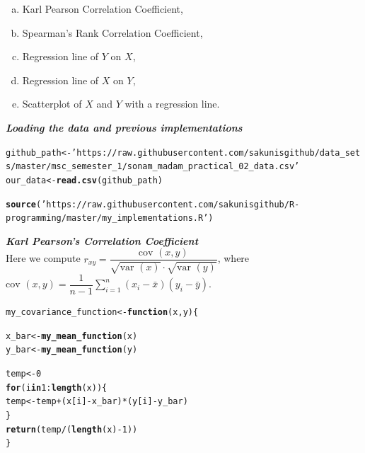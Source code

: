 \documentclass[11pt, a4paper]{article}\usepackage[]{graphicx}\usepackage[]{xcolor}
\makeatletter
\newcommand{\hlnum}[1]{\textcolor[rgb]{0.686,0.059,0.569}{#1}}%
\newcommand{\hlsng}[1]{\textcolor[rgb]{0.192,0.494,0.8}{#1}}%
\newcommand{\hlopt}[1]{\textcolor[rgb]{0,0,0}{#1}}%
\newcommand{\hldef}[1]{\textcolor[rgb]{0.345,0.345,0.345}{#1}}%
\newcommand{\hlkwa}[1]{\textcolor[rgb]{0.161,0.373,0.58}{\textbf{#1}}}%
\newcommand{\hlkwb}[1]{\textcolor[rgb]{0.69,0.353,0.396}{#1}}%
\newcommand{\hlkwc}[1]{\textcolor[rgb]{0.333,0.667,0.333}{#1}}%
\newcommand{\hlkwd}[1]{\textcolor[rgb]{0.737,0.353,0.396}{\textbf{#1}}}%
\newenvironment{kframe}{%
 \def\at@end@of@kframe{}%
 \ifinner\ifhmode%
  \def\at@end@of@kframe{\end{minipage}}%
  \begin{minipage}{\columnwidth}%
 \fi\fi%
 \def\FrameCommand##1{\hskip\@totalleftmargin \hskip-\fboxsep
 \colorbox{shadecolor}{##1}\hskip-\fboxsep
     \hskip-\linewidth \hskip-\@totalleftmargin \hskip\columnwidth}%
 \MakeFramed {\advance\hsize-\width
   \@totalleftmargin\z@ \linewidth\hsize
   \@setminipage}}%
 {\par\unskip\endMakeFramed%
 \at@end@of@kframe}
\newenvironment{knitrout}{}{} %
\makeatother
\begin{document}
\begin{enumerate}[(a)]
  \item Karl Pearson Correlation Coefficient,
  \item Spearman's Rank Correlation Coefficient,
  \item Regression line of $Y$ on $X$,
  \item Regression line of $X$ on $Y$,
  \item Scatterplot of $X$ and $Y$ with a regression line.
\end{enumerate}

\faArrowAltCircleRight[regular] \textit{\textbf{Loading the data and previous implementations}}

\begin{knitrout}\tiny
{}\color{fgcolor}\begin{kframe}
\begin{alltt}
\hldef{github_path} \hlkwb{<-} \hlsng{'https://raw.githubusercontent.com/sakunisgithub/data_sets/master/msc_semester_1/sonam_madam_practical_02_data.csv'}
\hldef{our_data} \hlkwb{<-} \hlkwd{read.csv}\hldef{(github_path)}

\hlkwd{source}\hldef{(}\hlsng{'https://raw.githubusercontent.com/sakunisgithub/R-programming/master/my_implementations.R'}\hldef{)}
\end{alltt}
\end{kframe}
\end{knitrout}

\newpage

\faArrowAltCircleRight[regular] \textit{\textbf{Karl Pearson's Correlation Coefficient}} \\

Here we compute $r_{xy} = \dfrac{\text{cov } (x, y)}{\sqrt{\text{var } (x)} \cdot \sqrt{\text{var } (y)}}$, where $\text{cov } (x, y) = \dfrac{1}{n-1} \sum \limits_{i = 1}^{n} (x_i - \bar{x})(y_i - \bar{y})$.

\begin{knitrout}\footnotesize
{}\color{fgcolor}\begin{kframe}
\begin{alltt}
\hldef{my_covariance_function} \hlkwb{<-} \hlkwa{function}\hldef{(}\hlkwc{x}\hldef{,} \hlkwc{y}\hldef{)\{}

  \hldef{x_bar} \hlkwb{<-} \hlkwd{my_mean_function}\hldef{(x)}
  \hldef{y_bar} \hlkwb{<-} \hlkwd{my_mean_function}\hldef{(y)}

  \hldef{temp} \hlkwb{<-} \hlnum{0}
  \hlkwa{for} \hldef{(i} \hlkwa{in} \hlnum{1}\hlopt{:}\hlkwd{length}\hldef{(x)) \{}
    \hldef{temp} \hlkwb{<-} \hldef{temp} \hlopt{+} \hldef{(x[i]} \hlopt{-} \hldef{x_bar)} \hlopt{*} \hldef{(y[i]} \hlopt{-} \hldef{y_bar)}
  \hldef{\}}
  \hlkwd{return}\hldef{(temp}\hlopt{/}\hldef{(}\hlkwd{length}\hldef{(x)} \hlopt{-} \hlnum{1}\hldef{))}
\hldef{\}}
\end{alltt}
\end{kframe}
\end{knitrout}
\end{document}
